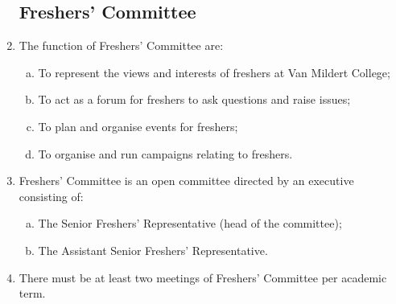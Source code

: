 \documentclass[12pt]{article}
\begin{document}
\begin{enumerate}
    \subsection{Freshers' Committee}
    \item The function of Freshers’ Committee are:
    \begin{enumerate} [(a)]
        \item To represent the views and interests of freshers at Van Mildert College;
        \item To act as a forum for freshers to ask questions and raise issues;
        \item To plan and organise events for freshers;
        \item To organise and run campaigns relating to freshers.
    \end{enumerate}
    \item  Freshers’ Committee is an open committee directed by an executive consisting of:
    \begin{enumerate} [(a)]
        \item The Senior Freshers’ Representative (head of the committee); 
        \item The Assistant Senior Freshers’ Representative.
    \end{enumerate}
    \item There must be at least two meetings of Freshers’ Committee per academic term.
\end{enumerate}
\end{document}
